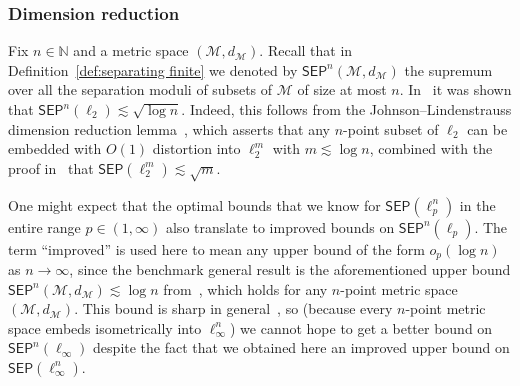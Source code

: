 \documentclass[11pt,reqno]{amsart}
\theoremstyle{remark}
\newcommand{\MM}{\mathcal{M}}
\newcommand{\N}{\mathbb N}
\renewcommand{\1}{\mathbf 1}
\newcommand{\sep}{\mathsf{SEP}}
\begin{document}
\subsubsection{Dimension reduction} Fix $n\in \N$ and a metric space $(\MM,d_\MM)$. Recall that in Definition~\ref{def:separating finite} we denoted by $\sep^n(\MM,d_\MM)$ the supremum over all the separation moduli of subsets of $\MM$ of size at most $n$. In~\cite{CCGGP98} it was shown that $\sep^n(\ell_2)\lesssim \sqrt{\log n}$. Indeed, this follows from  the Johnson--Lindenstrauss dimension reduction lemma~\cite{JL84}, which asserts that any $n$-point subset of $\ell_2$ can be embedded with $O(1)$ distortion into $\ell_2^m$ with $m\lesssim \log n$, combined with the proof in~\cite{CCGGP98} that $\sep(\ell_2^m)\lesssim \sqrt{m}$.

One might expect that the optimal bounds that we know for $\sep(\ell_p^n)$ in the entire range $p\in (1,\infty)$ also translate to improved bounds on $\sep^n(\ell_p)$. The term ``improved'' is used here to mean any upper  bound of the form $o_p(\log n)$ as $n\to \infty$, since the benchmark general result is the aforementioned  upper bound  $\sep^n(\MM,d_\MM)\lesssim \log n$ from~\cite{Bar96}, which holds for any $n$-point metric space $(\MM,d_\MM)$. This bound is  sharp in general~\cite{Bar96}, so (because every $n$-point metric space embeds isometrically into $\ell_\infty^n$) we cannot hope to get a better bound on $\sep^n(\ell_\infty)$ despite the fact that  we obtained here an improved upper bound on $\sep(\ell_\infty^n)$.
\end{document}
